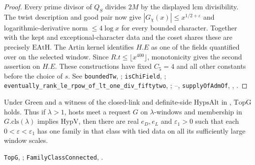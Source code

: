 \begin{proof}
Every prime divisor of $Q_S$ divides $2M$ by the displayed lcm divisibility.
The twist description and good pair now give
$|G_\chi(x)|\le x^{1/2+\varepsilon}$ and logarithmic-derivative norm
$\le4\log x$ for every bounded character. Together with the kept and
exceptional-character data and the coset shares these are precisely
$\mathrm{EAtH}$. The Artin kernel identifies $H.E$ as one of the fields
quantified over on the selected window. Since $R.t\le\lfloor
x^{400}\rfloor$, monotonicity gives the second assertion on $H.E$.
These constructions have fixed $C_5=4$ and all other constants before
the choice of $s$. See \nolinkurl{boundedTw}, ;
\nolinkurl{isChiField}, ;
\nolinkurl{eventually_rank_le_rpow_of_lt_one_div_fiftytwo},
;
--, \nolinkurl{supplyOfAdmOf},
, .
\end{proof}

\begin{proposition}
Under Green and a witness of the closed-link and definite-side
$\mathrm{HypsAlt}$ in , $\mathrm{TopG}$ holds. Thus if
$\lambda>1$, hosts meet a request $G$ on $\lambda$-windows and membership
in $G.\mathrm{cls}(\lambda)$ implies $\mathrm{HypV}$, then there are real
$e_D,e_L$ and $\varepsilon_1>0$
such that each $0<\varepsilon<\varepsilon_1$ has one family in that class
with tied data on all its sufficiently large window scales.
\end{proposition}
\noindent\nolinkurl{TopG}, ;
\nolinkurl{FamilyClassConnected}, .

